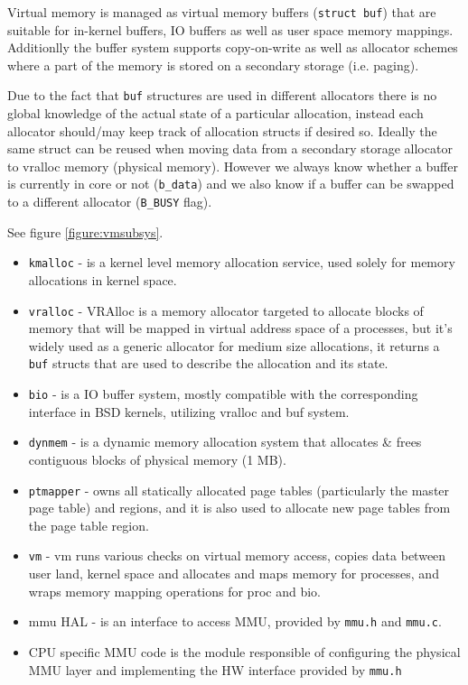 Virtual memory is managed as virtual memory buffers (\verb+struct buf+) that
are suitable for in-kernel buffers, IO buffers as well as user space memory
mappings. Additionlly the buffer system supports copy-on-write as well as
allocator schemes where a part of the memory is stored on a secondary
storage (i.e. paging).

Due to the fact that \verb+buf+ structures are used in different allocators
there is no global knowledge of the actual state of a particular allocation,
instead each allocator should/may keep track of allocation structs if desired
so. Ideally the same struct can be reused when moving data from a secondary
storage allocator to vralloc memory (physical memory). However we
always know whether a buffer is currently in core or not (\verb+b_data+) and
we also know if a buffer can be swapped to a different allocator
(\verb+B_BUSY+ flag).

See figure \ref{figure:vmsubsys}.

\begin{itemize}
  \item \verb+kmalloc+  - is a kernel level memory allocation service, used
                        solely for memory allocations in kernel space.
  \item \verb+vralloc+  - VRAlloc is a memory allocator targeted to allocate
                        blocks of memory that will be mapped in virtual
                        address space of a processes, but it's widely used
                        as a generic allocator for medium size allocations,
                        it returns a \verb+buf+ structs that are used to
                        describe the allocation and its state.
  \item \verb+bio+      - is a IO buffer system, mostly compatible with the
                        corresponding interface in BSD kernels,
                        utilizing vralloc and buf system.
  \item \verb+dynmem+   - is a dynamic memory allocation system that allocates
                        \& frees contiguous blocks of physical memory (1 MB).
  \item \verb+ptmapper+ - owns all statically allocated page tables
                        (particularly the master page table) and regions,
                        and it is also used to allocate new page tables from
                        the page table region.
  \item \verb+vm+       - vm runs various checks on virtual memory access,
                        copies data between user land, kernel space and
                        allocates and maps memory for processes, and wraps
                        memory mapping operations for proc and \acs{bio}.
  \item mmu HAL -       is an interface to access MMU, provided by \verb+mmu.h+
                        and \verb+mmu.c+.
  \item CPU specific MMU code is the module responsible of configuring the
        physical MMU layer and implementing the HW interface provided by
        \verb+mmu.h+
\end{itemize}


